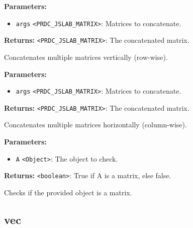 \documentclass[12pt,a4paper]{article}
\begin{document}
\vspace{5mm}
\noindent {}


\noindent \textbf{Parameters:}
\begin{itemize}
  \item \texttt{args} \texttt{<PRDC\_JSLAB\_MATRIX>}: Matrices to concatenate.
\end{itemize}

\noindent \textbf{Returns:} \texttt{<PRDC\_JSLAB\_MATRIX>}: The concatenated matrix.

\noindent Concatenates multiple matrices vertically (row-wise).

\vspace{5mm}
\noindent {}


\noindent \textbf{Parameters:}
\begin{itemize}
  \item \texttt{args} \texttt{<PRDC\_JSLAB\_MATRIX>}: Matrices to concatenate.
\end{itemize}

\noindent \textbf{Returns:} \texttt{<PRDC\_JSLAB\_MATRIX>}: The concatenated matrix.

\noindent Concatenates multiple matrices horizontally (column-wise).

\vspace{5mm}
\noindent {}


\noindent \textbf{Parameters:}
\begin{itemize}
  \item \texttt{A} \texttt{<Object>}: The object to check.
\end{itemize}

\noindent \textbf{Returns:} \texttt{<boolean>}: True if A is a matrix, else false.

\noindent Checks if the provided object is a matrix.


\subsection{vec}
\vspace{5mm}
\noindent {}
\end{document}
